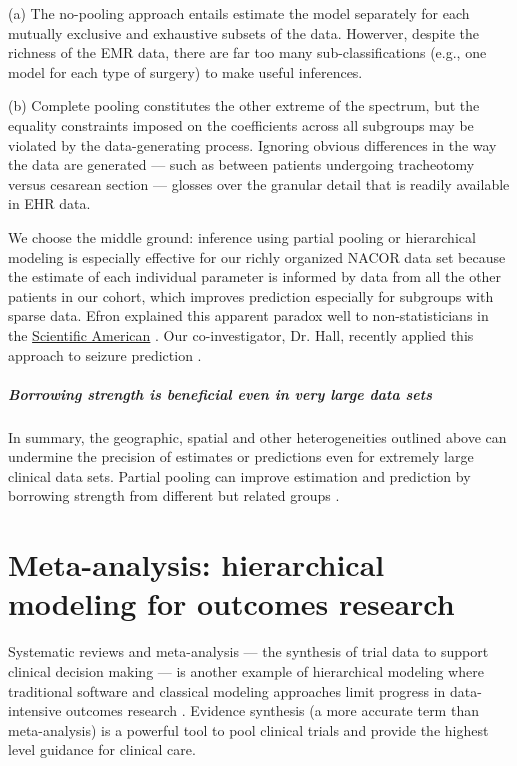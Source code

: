 \documentclass[11pt,notitlepage]{article}
\begin{document}
(a) The no-pooling approach entails estimate the model separately for each mutually exclusive and
exhaustive subsets of the data. Howerver, despite the richness of the EMR data, there are far too many 
sub-classifications (e.g., one model for each type of surgery) to make useful inferences.

(b) Complete pooling constitutes the other extreme of the spectrum, but the equality constraints 
imposed on the coefficients across all subgroups may be violated by the data-generating process. 
Ignoring obvious differences in the way the data are generated --- such 
as between patients undergoing tracheotomy versus cesarean section --- glosses
over the granular detail that is readily available in EHR data.

We choose the middle ground: inference using partial pooling or hierarchical modeling is especially effective 
for our richly organized NACOR data set because the estimate of each individual parameter is informed by data from 
all the other patients in our cohort, which improves prediction especially for subgroups with sparse data. \cite{Gelman2009} 
Efron explained this apparent paradox well to non-statisticians in the 
\href{http://www.nature.com/scientificamerican/journal/v236/n5/pdf/
scientificamerican0577-119.pdf}{Scientific American}
\cite{Stein_paradox_Scientific_American}. 
Our co-investigator, Dr. Hall, recently applied this approach to seizure prediction \cite{Hall2009a}.

\subparagraph*{Borrowing strength is beneficial even in very large data sets}
In summary, the geographic, spatial and other heterogeneities outlined above  
can undermine the precision of estimates or predictions even for 
extremely large clinical data sets. Partial pooling can improve estimation and prediction
by borrowing strength from different but related groups
\cite{Tukey1963borrowing,Jones1986collected}. 

\section*{Meta-analysis: hierarchical modeling for outcomes research}
Systematic reviews and meta-analysis \cite{Sackett1996} --- the synthesis of trial data 
to support clinical decision making --- is another example of hierarchical modeling where traditional software and 
classical modeling approaches limit progress in data-intensive outcomes research \cite{Andreae2015}.  
Evidence synthesis (a more accurate term than meta-analysis) is a powerful tool 
to pool clinical trials and provide the highest level guidance for clinical care\cite{Ashby2000,Cook1997}. 
\end{document}
